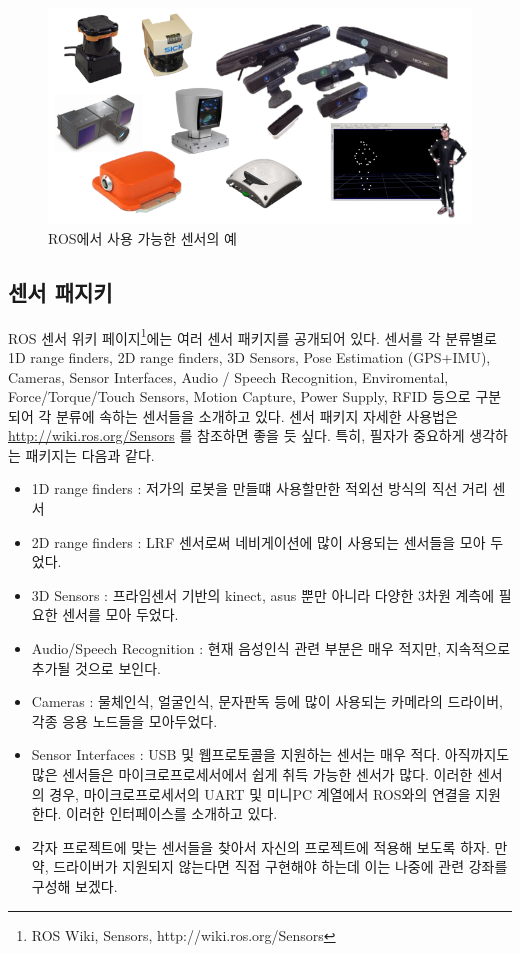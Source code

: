 \begin{figure}[h]
\centering\includegraphics[width=0.8\columnwidth]{pictures/chapter8/sensors.png}
\caption{ROS에서 사용 가능한 센서의 예}
\end{figure}

\subsection{센서 패지키}

ROS 센서 위키 페이지\footnote{ROS Wiki, Sensors, http://wiki.ros.org/Sensors}에는 여러 센서 패키지를 공개되어 있다. 센서를 각 분류별로 1D range finders, 2D range finders, 3D Sensors, Pose Estimation (GPS+IMU), Cameras, Sensor Interfaces, Audio / Speech Recognition, Enviromental, Force/Torque/Touch Sensors, Motion Capture, Power Supply, RFID 등으로 구분되어 각 분류에 속하는 센서들을 소개하고 있다. 센서 패키지 자세한 사용법은 \url{http://wiki.ros.org/Sensors} 를 참조하면 좋을 듯 싶다. 특히, 필자가 중요하게 생각하는 패키지는 다음과 같다.

\vspace{\baselineskip}
\begin{itemize}[leftmargin=*]
\item 1D range finders : 저가의 로봇을 만들떄 사용할만한 적외선 방식의 직선 거리 센서
\item 2D range finders : LRF 센서로써 네비게이션에 많이 사용되는 센서들을 모아 두었다.
\item 3D Sensors : 프라임센서 기반의 kinect, asus 뿐만 아니라 다양한 3차원 계측에 필요한 센서를 모아 두었다.
\item Audio/Speech Recognition : 현재 음성인식 관련 부분은 매우 적지만, 지속적으로 추가될 것으로 보인다.
\item Cameras : 물체인식, 얼굴인식, 문자판독 등에 많이 사용되는 카메라의 드라이버, 각종 응용 노드들을 모아두었다.
\item Sensor Interfaces : USB 및 웹프로토콜을 지원하는 센서는 매우 적다. 아직까지도 많은 센서들은 마이크로프로세서에서 쉽게 취득 가능한 센서가 많다. 이러한 센서의 경우, 마이크로프로세서의 UART 및 미니PC 계열에서 ROS와의 연결을 지원한다. 이러한 인터페이스를 소개하고 있다.
 \item 각자 프로젝트에 맞는 센서들을 찾아서 자신의 프로젝트에 적용해 보도록 하자. 만약, 드라이버가 지원되지 않는다면 직접 구현해야 하는데 이는 나중에 관련 강좌를 구성해 보겠다.
\end{itemize}

